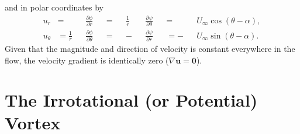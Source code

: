 \documentclass[10pt, twoside]{book}
\begin{document}
			and in polar coordinates by
			\begin{subequations}
				\label{eq:UniformFlowPolar}
				\begin{alignat}{7}
					u_r &= &&\frac{\partial\phi}{\partial r} &&=  &&\frac{1}{r}&&\frac{\partial\psi}{\partial \theta} &&= &&U_{\infty}\cos\left(\theta - \alpha\right),\label{eq:UniformFlowVelUr}\\
					u_{\theta} &= \frac{1}{r}&&\frac{\partial\phi}{\partial \theta} &&= &&-&&\frac{\partial\psi}{\partial r} &&= -&&U_{\infty}\sin\left(\theta - \alpha\right).\label{eq:UniformFlowVelUt}
				\end{alignat}
			\end{subequations}
			Given that the magnitude and direction of velocity is constant everywhere in the flow, the velocity gradient is identically zero ($\nabla\mathbf{u} = \mathbf{0}$).
			
		\section{\label{sec:IrrotVortex}The Irrotational (or Potential) Vortex}
			
\end{document}
